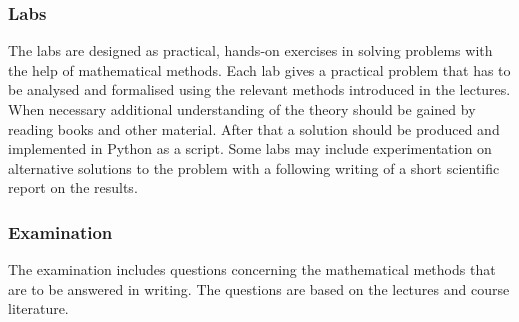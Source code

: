 \documentclass[10pt]{article}
\begin{document}
\subsubsection*{Labs}
The labs are designed as practical, hands-on exercises in solving
problems with the help of mathematical methods. Each lab gives a
practical problem that has to be analysed and formalised using the
relevant methods introduced in the lectures. When necessary additional
understanding of the theory should be gained by reading books and
other material. After that a solution should be produced and
implemented in Python as a script. Some labs may include
experimentation on alternative solutions to the problem with a
following writing of a short scientific report on the results.

\subsubsection*{Examination}
The examination includes questions concerning the mathematical methods
that are to be answered in writing. The questions are based on the
lectures and course literature.
\end{document}
